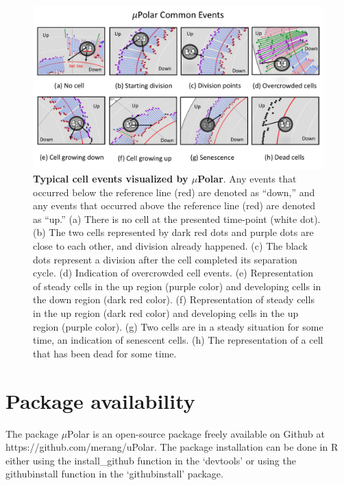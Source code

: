 \documentclass[conference]{IEEEtran}
\begin{document}
\begin{figure}
\centering
\includegraphics[width=\textwidth,height=10 cm]{Patterns/read.pdf}
\caption{\textbf{ Typical cell events visualized by $\mu$Polar}. Any events that occurred below the reference line (red) are denoted as ``down,'' and any events that occurred above the reference line (red) are denoted as ``up.'' (a) There is no cell at the presented time-point (white dot).
(b) The two cells represented by dark red dots and purple dots are close to each other, and division already happened. (c) The black dots represent a division after the cell completed its separation cycle. (d) Indication of overcrowded cell events. (e) Representation of steady cells in the up region (purple color) and developing cells in the down region (dark red color). (f) Representation of steady cells in the up region (dark red color) and developing cells in the up region (purple color). (g) Two cells are in a steady situation for some time, an indication of senescent cells. (h) The representation of a cell that has been dead for some time. }
\label{fig:read}
\end{figure}


\section{Package availability}
The package $\mu$Polar is an open-source package freely available on Github at https://github.com/merang/uPolar. The package installation can be done in R either using the install\_github function in the ‘devtools’ or using the githubinstall function in the ‘githubinstall’ package. 
\end{document}

